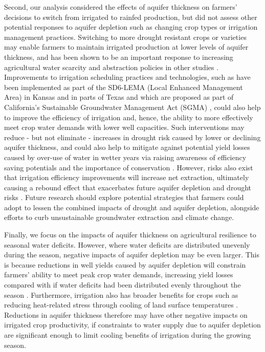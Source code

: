 \documentclass[
]{article}
\begin{document}
Second, our analysis considered the effects of aquifer thickness on farmers' decisions to switch from irrigated to rainfed production, but did not assess other potential responses to aquifer depletion such as changing crop types or irrigation management practices. Switching to more drought resistant crops or varieties may enable farmers to maintain irrigated production at lower levels of aquifer thickness, and has been shown to be an important response to increasing agricultural water scarcity and abstraction policies in other studies \citep{bhattarai2021impact, deines2019quantifying, manning2017producer}. Improvements to irrigation scheduling practices and technologies, such as have been implemented as part of the SD6-LEMA (Local Enhanced Management Area) in Kansas \citep{deines2019quantifying, glose2022quantifying} and in parts of Texas \citep{mrad2020peak} and which are proposed as part of California's Sustainable Groundwater Management Act (SGMA) \citep{berbel2019droughts, lubell2020sustainable}, could also help to improve the efficiency of irrigation and, hence, the ability to more effectively meet crop water demands with lower well capacities. Such interventions may reduce - but not eliminate - increases in drought risk caused by lower or declining aquifer thickness, and could also help to mitigate against potential yield losses caused by over-use of water in wetter years via raising awareness of efficiency saving potentials \citep{foster2019assessing} and the importance of conservation \citep{marston2022}. However, risks also exist that irrigation efficiency improvements will increase net extraction, ultimately causing a rebound effect that exacerbates future aquifer depletion and drought risks \citep{grafton2018paradox,perez2021agricultural}. Future research should explore potential strategies that farmers could adopt to lessen the combined impacts of drought and aquifer depletion, alongside efforts to curb unsustainable groundwater extraction and climate change.

Finally, we focus on the impacts of aquifer thickness on agricultural resilience to seasonal water deficits. However, where water deficits are distributed unevenly during the season, negative impacts of aquifer depletion may be even larger. This is because reductions in well yields caused by aquifer depletion will constrain farmers' ability to meet peak crop water demands, increasing yield losses compared with if water deficits had been distributed evenly throughout the season \citep{ortiz2019unpacking}. Furthermore, irrigation also has broader benefits for crops such as reducing heat-related stress through cooling of land surface temperatures \citep{adegoke2003impact, bonfils2007empirical, lobell2008effect, zhu2022untangling}. Reductions in aquifer thickness therefore may have other negative impacts on irrigated crop productivity, if constraints to water supply due to aquifer depletion are significant enough to limit cooling benefits of irrigation during the growing season.
\end{document}
